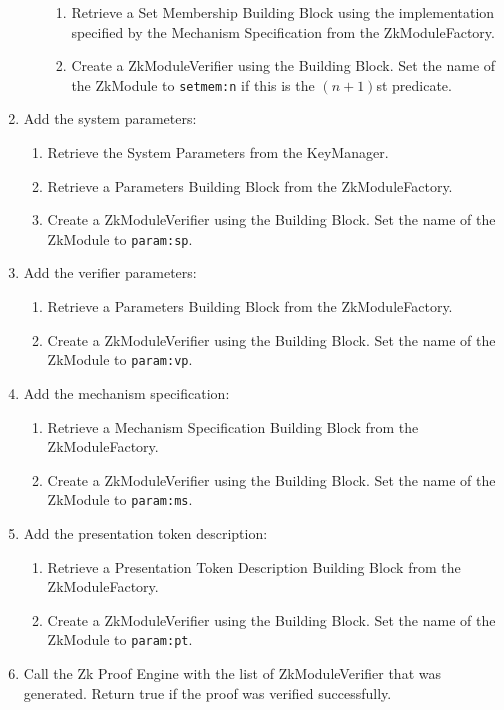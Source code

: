 \begin{enumerate}
\begin{enumerate}
            \begin{enumerate}
              \item Retrieve a Set Membership Building Block using the implementation specified by the Mechanism Specification from the ZkModuleFactory.
              \item Create a ZkModuleVerifier using the Building Block. Set the name of the ZkModule to
                \texttt{setmem:n} if this is the $(n+1)$st predicate.
            \end{enumerate}
        \end{enumerate}
      \item Add the system parameters:
        \begin{enumerate}
          \item Retrieve the System Parameters from the KeyManager.
          \item Retrieve a Parameters Building Block from the ZkModuleFactory.
          \item Create a ZkModuleVerifier using the Building Block. Set the name of the ZkModule to
            \texttt{param:sp}.
        \end{enumerate}
      \item Add the verifier parameters:
        \begin{enumerate}
          \item Retrieve a Parameters Building Block from the ZkModuleFactory.
          \item Create a ZkModuleVerifier using the Building Block. Set the name of the ZkModule to
            \texttt{param:vp}.
        \end{enumerate}
      \item Add the mechanism specification:
        \begin{enumerate}
          \item Retrieve a Mechanism Specification Building Block from the ZkModuleFactory.
          \item Create a ZkModuleVerifier using the Building Block. Set the name of the ZkModule to
            \texttt{param:ms}.
        \end{enumerate}
      \item Add the presentation token description:
        \begin{enumerate}
          \item Retrieve a Presentation Token Description Building Block from the ZkModuleFactory.
          \item Create a ZkModuleVerifier using the Building Block. Set the name of the ZkModule to
            \texttt{param:pt}.
        \end{enumerate}
      \item Call the Zk Proof Engine with the list of ZkModuleVerifier that was generated. Return true if
        the proof was verified successfully.
    \end{enumerate}


